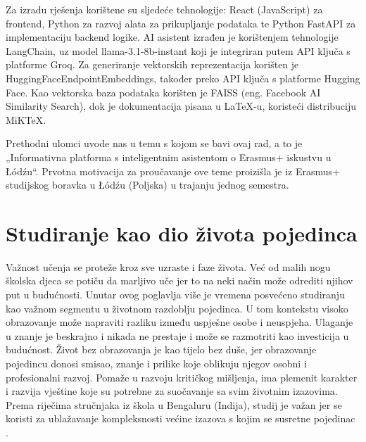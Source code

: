 \documentclass[]{foi}
\begin{document}
Za izradu rješenja korištene su sljedeće tehnologije: React (JavaScript) za frontend, Python za razvoj alata za prikupljanje podataka te Python FastAPI za implementaciju backend logike.
AI asistent izrađen je korištenjem tehnologije LangChain, uz model llama-3.1-8b-instant koji je integriran putem API ključa s platforme Groq. Za generiranje vektorskih reprezentacija 
korišten je HuggingFaceEndpointEmbeddings, također preko API ključa s platforme Hugging Face. Kao vektorska baza podataka korišten je FAISS (eng. Facebook AI Similarity Search), 
dok je dokumentacija pisana u LaTeX-u, koristeći distribuciju MiKTeX.

Prethodni ulomci uvode nas u temu s kojom se bavi ovaj rad, a to je „Informativna platforma s inteligentnim asistentom o Erasmus+ 
iskustvu u Łódźu“. Prvotna motivacija za proučavanje ove teme proizišla je iz Erasmus+ studijskog boravka u Łódźu (Poljska) u trajanju jednog semestra.

\chapter{Studiranje kao dio života pojedinca}
Važnost učenja se proteže kroz sve uzraste i faze života. Već od malih nogu školska djeca se potiču da marljivo uče jer to na neki način može odrediti njihov put u budućnosti.
Unutar ovog poglavlja više je vremena posvećeno studiranju kao važnom segmentu u životnom razdoblju pojedinca. U tom kontekstu visoko obrazovanje može napraviti razliku između uspješne osobe
i neuspjeha. Ulaganje u znanje je beskrajno i nikada ne prestaje i može se razmotriti kao investicija u budućnost. Život bez obrazovanja je kao tijelo bez duše, jer obrazovanje pojedincu donosi smisao, 
znanje i prilike koje oblikuju njegov osobni i profesionalni razvoj. Pomaže u razvoju kritičkog mišljenja, ima plemenit karakter i razvija vještine koje su potrebne za suočavanje sa svim životnim izazovima. 
Prema riječima stručnjaka iz škola u Bengaluru (Indija), studij je važan jer se koristi za ublažavanje kompleksnosti većine izazova s kojim se susretne pojedinac \cite{digital3602025studies}. 
\end{document}
